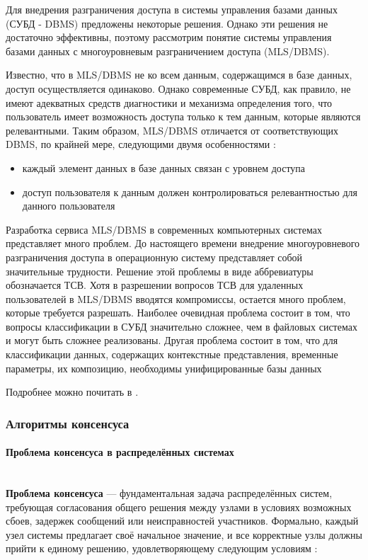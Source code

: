 Для внедрения разграничения доступа в системы  управления  базами  данных  (СУБД  -
DBMS)  предложены некоторые решения. Однако эти решения не достаточно
эффективны, поэтому рассмотрим понятие  системы
управления  базами  данных  с  многоуровневым  разграничением доступа (MLS/DBMS).

Известно, что в MLS/DBMS не ко всем данным, содержащимся в  базе
данных, доступ осуществляется одинаково. Однако современные СУБД, как
правило,  не имеют адекватных средств диагностики и механизма определения
того, что пользователь имеет возможность доступа только  к  тем
данным,  которые являются релевантными. Таким образом, MLS/DBMS отличается
от соответствующих DBMS,  по крайней  мере,  следующими  двумя
особенностями \autocite{SecureFix}:
\begin{itemize}
    \item каждый элемент данных в базе данных связан с уровнем доступа
    \item доступ пользователя к данным должен контролироваться релевантностью для данного пользователя
\end{itemize}
Разработка сервиса MLS/DBMS в современных компьютерных  системах
представляет  много  проблем. До настоящего времени внедрение многоуровневого
разграничения доступа в операционную  систему  представляет
собой  значительные трудности. Решение этой проблемы в виде аббревиатуры
обозначается ТСВ. Хотя в разрешении вопросов ТСВ  для  удаленных
пользователей  в  MLS/DBMS вводятся компромиссы, остается много проблем,
которые требуется разрешать. Наиболее очевидная проблема состоит
в том, что вопросы классификации в СУБД значительно  сложнее,  чем  в
файловых  системах  и могут быть сложнее реализованы. Другая проблема
состоит в том, что для классификации данных,  содержащих  контекстные
представления,  временные параметры, их композицию, необходимы унифицированные базы данных 

Подробнее можно почитать в \autocite{SecureFix}.

\subsubsection{Алгоритмы консенсуса}

\paragraph{Проблема консенсуса в распределённых системах}~\\ 

\textbf{Проблема консенсуса} — фундаментальная задача распределённых систем, требующая согласования общего решения между узлами в условиях возможных сбоев, задержек сообщений или 
неисправностей участников. Формально, каждый узел системы предлагает своё начальное значение, и все корректные узлы должны прийти к единому решению, удовлетворяющему следующим условиям \autocite{Consensus}: 

